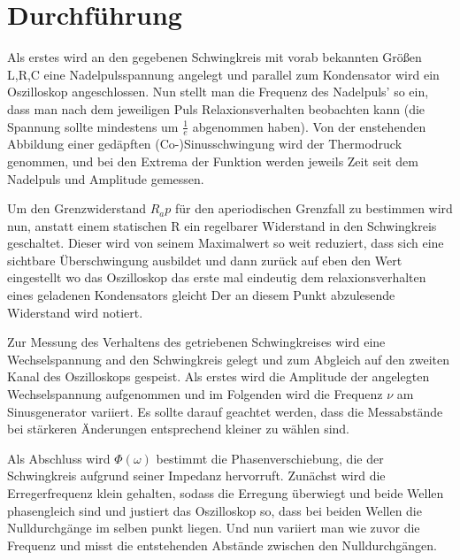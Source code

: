 \documentclass{scrartcl}
\begin{document}
    \section{Durchführung}
    \label{sec:Durchführung}
    Als erstes wird an den gegebenen Schwingkreis mit vorab bekannten Größen L,R,C
    eine Nadelpulsspannung angelegt und parallel zum Kondensator wird ein Oszilloskop angeschlossen.
    Nun stellt man die Frequenz des Nadelpuls' so ein, dass man nach dem jeweiligen Puls Relaxionsverhalten beobachten kann
    (die Spannung sollte mindestens um $\frac{1}{e}$ abgenommen haben).
    Von der enstehenden Abbildung einer gedäpften (Co-)Sinusschwingung wird der Thermodruck genommen,
    und bei den Extrema der Funktion werden jeweils Zeit seit dem Nadelpuls und Amplitude gemessen.

    Um den Grenzwiderstand $R_ap$ für den aperiodischen Grenzfall zu bestimmen wird nun,
    anstatt einem statischen R ein regelbarer Widerstand in den Schwingkreis geschaltet.
    Dieser wird von seinem Maximalwert so weit reduziert, dass sich eine sichtbare Überschwingung ausbildet
    und dann zurück auf eben den Wert eingestellt wo das Oszilloskop das erste mal eindeutig dem relaxionsverhalten eines geladenen Kondensators gleicht
    Der an diesem Punkt abzulesende Widerstand wird notiert.

    Zur Messung des Verhaltens des getriebenen Schwingkreises wird eine Wechselspannung and den Schwingkreis gelegt
    und zum Abgleich auf den zweiten Kanal des Oszilloskops gespeist.
    Als erstes wird die Amplitude der angelegten Wechselspannung aufgenommen
    und im Folgenden wird die Frequenz $\nu$ am Sinusgenerator variiert.
    Es sollte darauf geachtet werden, dass die Messabstände bei stärkeren Änderungen entsprechend kleiner zu wählen sind.

    Als Abschluss wird $\Phi(\omega)$ bestimmt die Phasenverschiebung, die der Schwingkreis aufgrund seiner Impedanz hervorruft.
    Zunächst wird die Erregerfrequenz klein gehalten, sodass die Erregung überwiegt und beide Wellen phasengleich sind
    und justiert das Oszilloskop so, dass bei beiden Wellen die Nulldurchgänge im selben punkt liegen.
    Und nun variiert man wie zuvor die Frequenz und misst die entstehenden Abstände zwischen den Nulldurchgängen.
\end{document}
